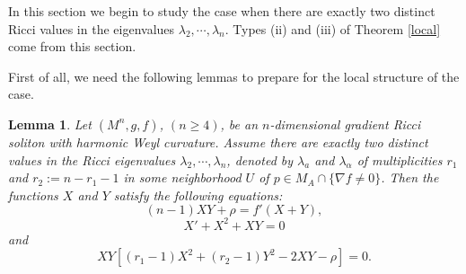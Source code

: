\documentclass{amsart}
\newtheorem{lemma}[theorem]{Lemma}
\theoremstyle{definition}
\theoremstyle{remark}
\numberwithin{equation}{section}
\begin{document}
	In this section we begin to study the case when there are exactly two distinct Ricci values in the eigenvalues 
  $\lambda_2, \cdots, \lambda_n$. Types {\rm (ii)} and {\rm (iii)} of Theorem \ref{local} come from this section.
	
	First of all, we need the following lemmas to prepare for the local structure of the case.
	
	\begin{lemma}\label{lemma5.1} 
		Let $(M^n, g, f)$, $(n\geq 4)$, be an $n$-dimensional gradient Ricci soliton with harmonic Weyl curvature.
		Assume there are exactly two distinct values in the Ricci eigenvalues $\lambda_2, \cdots, \lambda_n$, denoted by $\lambda_a$ and $\lambda_\alpha$ of multiplicities $r_1$ and $r_2:=n-r_1-1$ in some neighborhood $U$ of $p \in M_A \cap \{ \nabla f \neq 0  \}$.
		Then the functions $X$ and $Y$ satisfy the following equations:
		\begin{equation}\label{5.1}
	(n-1)XY+\rho=f'(X+Y),
		\end{equation}
	\begin{equation}\label{5.2}
		X'+X^2+XY=0
		\end{equation}		
{\rm and}		
\begin{equation}\label{5.3}
		XY[(r_1-1)X^2+(r_2-1)Y^2-2XY-\rho]=0.
\end{equation}	
	\end{lemma}
	
\end{document}
